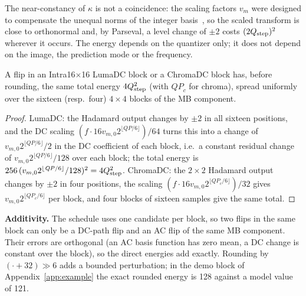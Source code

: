 The near-constancy of $\kappa$ is not a coincidence: the scaling factors $v_m$ were designed to compensate the unequal norms of the integer basis~\cite{malvar2003transform}, so the scaled transform is close to orthonormal and, by Parseval, a level change of $\pm2$ costs $(2Q_{\mathrm{step}})^2$ wherever it occurs. The energy depends on the quantizer only; it does not depend on the image, the prediction mode or the frequency.

\begin{lemma}[DC paths]
\label{lem:dc}
A flip in an Intra16$\times$16 LumaDC block or a ChromaDC block has, before rounding, the same total energy $4Q_{\mathrm{step}}^2$ (with $\mathit{QP}_c$ for chroma), spread uniformly over the sixteen (resp.\ four) $4\times4$ blocks of the MB component.
\end{lemma}
\begin{proof}
LumaDC: the Hadamard output changes by $\pm2$ in all sixteen positions, and the DC scaling $(f\cdot16v_{m,0}2^{\lfloor\mathit{QP}/6\rfloor})/64$ turns this into a change of $v_{m,0}2^{\lfloor\mathit{QP}/6\rfloor}/2$ in the DC coefficient of each block, i.e.\ a constant residual change of $v_{m,0}2^{\lfloor\mathit{QP}/6\rfloor}/128$ over each block; the total energy is $256\,(v_{m,0}2^{\lfloor\mathit{QP}/6\rfloor}/128)^2=4Q_{\mathrm{step}}^2$. ChromaDC: the $2\times2$ Hadamard output changes by $\pm2$ in four positions, the scaling $(f\cdot16v_{m,0}2^{\lfloor\mathit{QP}_c/6\rfloor})/32$ gives $v_{m,0}2^{\lfloor\mathit{QP}_c/6\rfloor}$ per block, and four blocks of sixteen samples give the same total.
\end{proof}

\textbf{Additivity.} The schedule uses one candidate per block, so two flips in the same block can only be a DC-path flip and an AC flip of the same MB component. Their errors are orthogonal (an AC basis function has zero mean, a DC change is constant over the block), so the direct energies add exactly. Rounding by $(\cdot+32)\gg6$ adds a bounded perturbation; in the demo block of Appendix~\ref{app:example} the exact rounded energy is 128 against a model value of 121.

